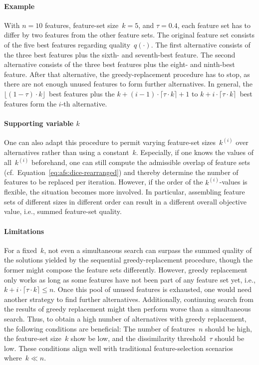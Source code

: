 \documentclass{article}
\theoremstyle{definition}
\begin{document}
\paragraph{Example}

With $n=10$ features, feature-set size~$k=5$, and $\tau=0.4$, each feature set has to differ by two features from the other feature sets.
The original feature set consists of the five best features regarding quality~$q(\cdot)$.
The first alternative consists of the three best features plus the sixth- and seventh-best feature.
The second alternative consists of the three best features plus the eight- and ninth-best feature.
After that alternative, the greedy-replacement procedure has to stop, as there are not enough unused features to form further alternatives.
In general, the $\lfloor (1 - \tau) \cdot k \rfloor$~best features plus the $k + (i-1) \cdot \lceil \tau \cdot k \rceil + 1$ to $k + i \cdot \lceil \tau \cdot k \rceil$~best features form the $i$-th alternative.

\paragraph{Supporting variable $k$}

One can also adapt this procedure to permit varying feature-set sizes~$k^{(i)}$ over alternatives rather than using a constant~$k$.
Especially, if one knows the values of all~$k^{(i)}$ beforehand, one can still compute the admissible overlap of feature sets (cf.~Equation~\ref{eq:afs:dice-rearranged}) and thereby determine the number of features to be replaced per iteration.
However, if the order of the $k^{(i)}$-values is flexible, the situation becomes more involved.
In particular, assembling feature sets of different sizes in different order can result in a different overall objective value, i.e., summed feature-set quality.

\paragraph{Limitations}

For a fixed~$k$, not even a simultaneous search can surpass the summed quality of the solutions yielded by the sequential greedy-replacement procedure, though the former might compose the feature sets differently.
However, greedy replacement only works as long as some features have not been part of any feature set yet, i.e., $k + i \cdot \lceil \tau \cdot k \rceil \leq n$.
Once this pool of unused features is exhausted, one would need another strategy to find further alternatives.
Additionally, continuing search from the results of greedy replacement might then perform worse than a simultaneous search.
Thus, to obtain a high number of alternatives with greedy replacement, the following conditions are beneficial:
The number of features~$n$ should be high, the feature-set size~$k$ show be low, and the dissimilarity threshold~$\tau$ should be low.
These conditions align well with traditional feature-selection scenarios where~$k \ll n$.
\end{document}
